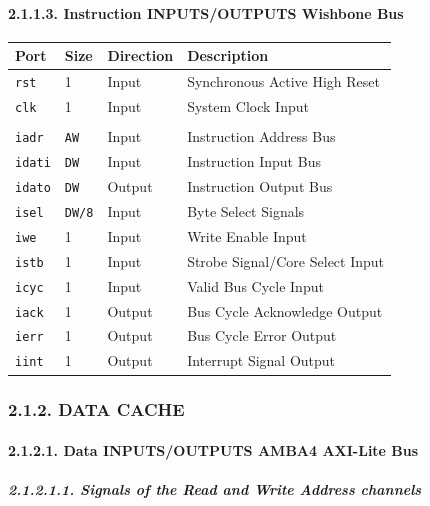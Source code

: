 \documentclass[
]{article}
\begin{document}
\hypertarget{instruction-inputsoutputs-wishbone-bus-1}{%
\paragraph{2.1.1.3. Instruction INPUTS/OUTPUTS Wishbone
Bus}\label{instruction-inputsoutputs-wishbone-bus-1}}

\begin{longtable}[]{@{}llll@{}}
\toprule
Port & Size & Direction & Description\tabularnewline
\midrule
\endhead
\texttt{rst} & 1 & Input & Synchronous Active High Reset\tabularnewline
\texttt{clk} & 1 & Input & System Clock Input\tabularnewline
& & &\tabularnewline
\texttt{iadr} & \texttt{AW} & Input & Instruction Address
Bus\tabularnewline
\texttt{idati} & \texttt{DW} & Input & Instruction Input
Bus\tabularnewline
\texttt{idato} & \texttt{DW} & Output & Instruction Output
Bus\tabularnewline
\texttt{isel} & \texttt{DW/8} & Input & Byte Select
Signals\tabularnewline
\texttt{iwe} & 1 & Input & Write Enable Input\tabularnewline
\texttt{istb} & 1 & Input & Strobe Signal/Core Select
Input\tabularnewline
\texttt{icyc} & 1 & Input & Valid Bus Cycle Input\tabularnewline
\texttt{iack} & 1 & Output & Bus Cycle Acknowledge Output\tabularnewline
\texttt{ierr} & 1 & Output & Bus Cycle Error Output\tabularnewline
\texttt{iint} & 1 & Output & Interrupt Signal Output\tabularnewline
\bottomrule
\end{longtable}

\hypertarget{data-cache-1}{%
\subsubsection{2.1.2. DATA CACHE}\label{data-cache-1}}

\hypertarget{data-inputsoutputs-amba4-axi-lite-bus-1}{%
\paragraph{2.1.2.1. Data INPUTS/OUTPUTS AMBA4 AXI-Lite
Bus}\label{data-inputsoutputs-amba4-axi-lite-bus-1}}

\hypertarget{signals-of-the-read-and-write-address-channels-3}{%
\subparagraph{2.1.2.1.1. Signals of the Read and Write Address
channels}\label{signals-of-the-read-and-write-address-channels-3}}
\end{document}
